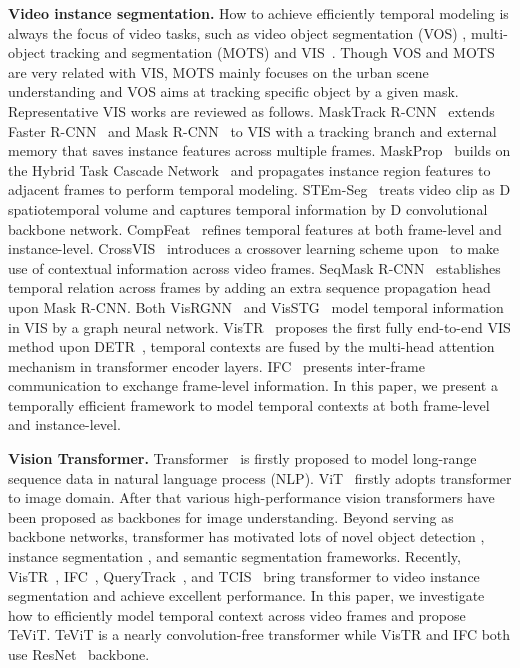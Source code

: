 \documentclass[10pt,twocolumn,letterpaper]{article}
\begin{document}
\noindent\textbf{Video instance segmentation.}
How to achieve efficiently temporal modeling is always the focus of video tasks, such as video object segmentation (VOS) \cite{uvos, uvos, stm}, multi-object tracking and segmentation (MOTS) \cite{mots} and VIS~\cite{vis}. Though VOS and MOTS are very related with VIS, MOTS mainly focuses on the urban scene understanding and VOS aims at tracking specific object by a given mask. Representative VIS works are reviewed as follows. MaskTrack R-CNN~\cite{vis} extends Faster R-CNN~\cite{fasterrcnn} and Mask R-CNN~\cite{maskrcnn} to VIS with a tracking branch and external memory that saves instance features across multiple frames. MaskProp~\cite{maskprop} builds on the Hybrid Task Cascade Network~\cite{htc} and propagates instance region features to adjacent frames to perform temporal modeling. STEm-Seg~\cite{stemseg} treats video clip as D spatiotemporal volume and captures temporal information by D convolutional backbone network. CompFeat~\cite{compfeat} refines temporal features at both frame-level and instance-level. CrossVIS~\cite{crossvis} introduces a crossover learning scheme upon~\cite{fcos, condinst} to make use of contextual information across video frames. SeqMask R-CNN~\cite{seqmaskrcnn} establishes temporal relation across frames by adding an extra sequence propagation head upon Mask R-CNN. Both VisRGNN~\cite{visrgnn} and VisSTG~\cite{visstg} model temporal information in VIS by a graph neural network. VisTR~\cite{vistr} proposes the first fully end-to-end VIS method upon DETR~\cite{detr}, temporal contexts are fused by the multi-head attention mechanism in transformer encoder layers. IFC~\cite{ifc} presents inter-frame communication to exchange frame-level information. In this paper, we present a temporally efficient framework to model temporal contexts at both frame-level and instance-level.

\noindent\textbf{Vision Transformer.}
Transformer~\cite{transformer} is firstly proposed to model long-range sequence data in natural language process (NLP). ViT~\cite{vit} firstly adopts transformer to image domain. After that various high-performance vision transformers \cite{swintransformer, halonet, deit, pvt, pvtv2, msgtransformer, shuffletransformer} have been proposed as backbones for image understanding. Beyond serving as backbone networks, transformer has motivated lots of novel object detection \cite{detr, defdetr, sparsercnn, conddetr, yolos}, instance segmentation \cite{queryinst, solq, knet}, and semantic segmentation \cite{segformer, segmenter, maskformer} frameworks. Recently, VisTR~\cite{vistr}, IFC~\cite{ifc}, QueryTrack~\cite{querytrack}, and TCIS~\cite{tcis} bring transformer to video instance segmentation and achieve excellent performance. In this paper, we investigate how to efficiently model temporal context across video frames and propose TeViT. TeViT is a nearly convolution-free transformer while VisTR and IFC both use ResNet~\cite{resnet} backbone.
\end{document}
